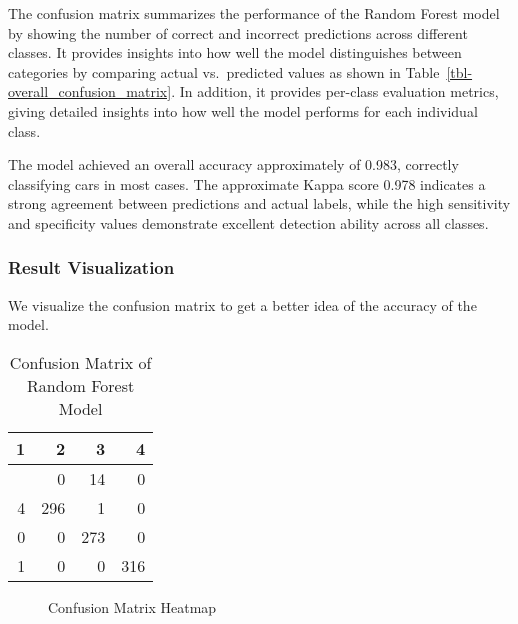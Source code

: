 \documentclass[
  letterpaper,
  DIV=11,
  numbers=noendperiod]{scrartcl}
\begin{document}
The confusion matrix summarizes the performance of the Random Forest
model by showing the number of correct and incorrect predictions across
different classes. It provides insights into how well the model
distinguishes between categories by comparing actual vs.~predicted
values as shown in Table~\ref{tbl-overall_confusion_matrix}. In
addition, it provides per-class evaluation metrics, giving detailed
insights into how well the model performs for each individual class.

The model achieved an overall accuracy approximately of 0.983, correctly
classifying cars in most cases. The approximate Kappa score 0.978
indicates a strong agreement between predictions and actual labels,
while the high sensitivity and specificity values demonstrate excellent
detection ability across all classes.

\subsubsection{Result Visualization}\label{result-visualization}

We visualize the confusion matrix to get a better idea of the accuracy
of the model.

\begin{longtable}[]{@{}rrrr@{}}

\caption{\label{tbl-confusion_matrix_table}Confusion Matrix of Random
Forest Model}

\tabularnewline

\toprule\noalign{}
1 & 2 & 3 & 4 \\
\midrule\noalign{}
\endhead
\bottomrule\noalign{}
\endlastfoot
305 & 0 & 14 & 0 \\
4 & 296 & 1 & 0 \\
0 & 0 & 273 & 0 \\
1 & 0 & 0 & 316 \\

\end{longtable}

\begin{figure}


\caption{\label{fig-confusion_maxtrix__heatmap}Confusion Matrix Heatmap}

\end{figure}%
\end{document}
